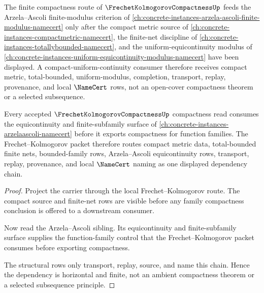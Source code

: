 The finite compactness route of $\FrechetKolmogorovCompactnessUp$ feeds the
Arzela--Ascoli finite-modulus criterion of
\autoref{ch:concrete-instances-arzela-ascoli-finite-modulus-namecert} only
after the compact metric source of
\autoref{ch:concrete-instances-compactmetric-namecert}, the finite-net
discipline of \autoref{ch:concrete-instances-totallybounded-namecert}, and the
uniform-equicontinuity modulus of
\autoref{ch:concrete-instances-uniform-equicontinuity-modulus-namecert} have
been displayed. A compact-uniform-continuity consumer therefore receives
compact metric, total-bounded, uniform-modulus, completion, transport, replay,
provenance, and local $\NameCert$ rows, not an open-cover compactness theorem
or a selected subsequence.

\begin{theorem}
\label{thm:frechet-kolmogorov-arzela-ascoli-dependency-route}
Every accepted $\FrechetKolmogorovCompactnessUp$ compactness read consumes the
equicontinuity and finite-subfamily surface of
\autoref{ch:concrete-instances-arzelaascoli-namecert} before it exports
compactness for function families. The Frechet--Kolmogorov packet therefore
routes compact metric data, total-bounded finite nets, bounded-family rows,
Arzela--Ascoli equicontinuity rows, transport, replay, provenance, and local
$\NameCert$ naming as one displayed dependency chain.
\end{theorem}
\begin{proof}
Project the carrier through the local Frechet--Kolmogorov route. The compact
source and finite-net rows are visible before any family compactness conclusion
is offered to a downstream consumer.

Now read the Arzela--Ascoli sibling. Its equicontinuity and finite-subfamily
surface supplies the function-family control that the Frechet--Kolmogorov
packet consumes before exporting compactness.

The structural rows only transport, replay, source, and name this chain. Hence
the dependency is horizontal and finite, not an ambient compactness theorem or
a selected subsequence principle.
\end{proof}

